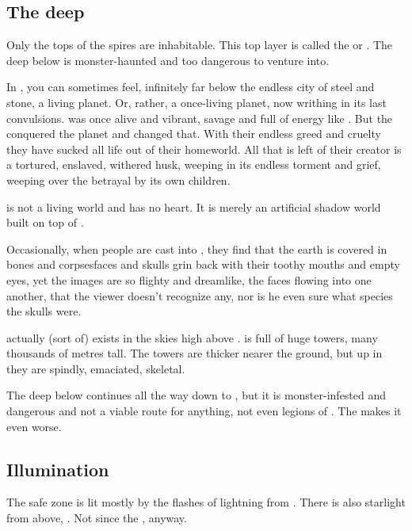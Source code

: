 \subsection{The deep}
Only the tops of the spires are inhabitable. 
This top layer is called the  or . 
The deep below is monster-haunted and too dangerous to venture into. 

In \Nyx, you can sometimes feel, infinitely far below the endless city of steel and stone, a living planet. 
Or, rather, a once-living planet, now writhing in its last convulsions. 
\FatherErebos{} was once alive and vibrant, savage and full of energy like \Miith{}. 
But the \banes{} conquered the planet and changed that. 
With their endless greed and cruelty they have sucked all life out of their homeworld. 
All that is left of their creator is a tortured, enslaved, withered husk, weeping in its endless torment and grief, weeping over the betrayal by its own children. 

\Nyx{} is not a living world and has no heart. It is merely an artificial shadow world built on top of \Erebos. 

Occasionally, when people are cast into \Nyx, they find that the earth is covered in bones and corpses\dash faces and skulls grin back with their toothy mouths and empty eyes, yet the images are so flighty and dreamlike, the faces flowing into one another, that the viewer doesn't recognize any, nor is he even sure what species the skulls were. 

\Nyx{} actually (sort of) exists in the skies high above \Erebos. 
\Erebos{} is full of huge towers, many thousands of metres tall. 
The towers are thicker nearer the ground, but up in \Nyx{} they are spindly, emaciated, skeletal. 

The deep below \Nyx{} continues all the way down to \Erebos, but it is monster-infested and dangerous and not a viable route for anything, not even legions of \banes. 
The \CrystalSphere{} makes it even worse. 







\subsection{Illumination}
The \resphan{} safe zone is lit mostly by the flashes of lightning from . 
There is also starlight from above, . 
Not since the , anyway. 





